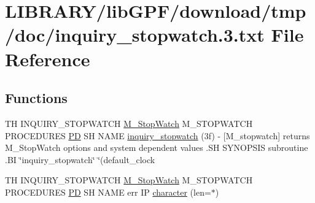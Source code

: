 \hypertarget{inquiry__stopwatch_83_8txt}{}\section{L\+I\+B\+R\+A\+R\+Y/lib\+G\+P\+F/download/tmp/doc/inquiry\+\_\+stopwatch.3.txt File Reference}
\label{inquiry__stopwatch_83_8txt}
\subsection*{Functions}
\begin{DoxyCompactItemize}
\item 
TH I\+N\+Q\+U\+I\+R\+Y\+\_\+\+S\+T\+O\+P\+W\+A\+T\+CH \hyperlink{option__stopwatch_83_8txt_aa2011fc45a5e502e87ee50996a8a9305}{M\+\_\+\+Stop\+Watch} M\+\_\+\+S\+T\+O\+P\+W\+A\+T\+CH P\+R\+O\+C\+E\+D\+U\+R\+ES \hyperlink{what__overview_81_8txt_a85f26da5a4481fbdb0d9c79f2b94de3e}{PD} SH N\+A\+ME \hyperlink{inquiry__stopwatch_83_8txt_a4dada9d717f128f440143c7c9e065435}{inquiry\+\_\+stopwatch} (3f) -\/ \mbox{[}\+M\+\_\+stopwatch\mbox{]} returns M\+\_\+\+Stop\+Watch options and system dependent values .\+S\+H S\+Y\+N\+O\+P\+S\+I\+S subroutine .\+B\+I \char`\"{}inquiry\+\_\+stopwatch\char`\"{} \char`\"{}(default\+\_\+clock
\item 
TH I\+N\+Q\+U\+I\+R\+Y\+\_\+\+S\+T\+O\+P\+W\+A\+T\+CH \hyperlink{option__stopwatch_83_8txt_aa2011fc45a5e502e87ee50996a8a9305}{M\+\_\+\+Stop\+Watch} M\+\_\+\+S\+T\+O\+P\+W\+A\+T\+CH P\+R\+O\+C\+E\+D\+U\+R\+ES \hyperlink{what__overview_81_8txt_a85f26da5a4481fbdb0d9c79f2b94de3e}{PD} SH N\+A\+ME err IP \hyperlink{inquiry__stopwatch_83_8txt_ab2e20a25f5ea8f5986290d5c6d860dac}{character} (len=$\ast$)
\end{DoxyCompactItemize}
